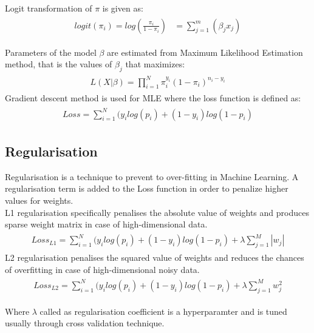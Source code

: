 \documentclass[paper=a4,fontsize=12pt]{article}
\begin{document}
Logit transformation of $\pi$ is given as: 
\begin{align*}
\begin{split}
logit(\pi_i) = log(\frac{\pi_i}{1-\pi_i})
&= \sum_{j=1}^{m} (\beta_j x_j)
\end{split}
\end{align*}

Parameters of the model $\beta$ are estimated from Maximum Likelihood Estimation method, that is the values of $\beta_j$ that maximizes:
\begin{align*}
\begin{split}
L(X|\beta) = \prod_{i=1}^{N} \pi_i^{y_i} (1-\pi_i)^{n_i - y_i}  
\end{split}
\end{align*}
Gradient descent method is used for MLE where the loss function is defined as:
\begin{align*}
\begin{split}
Loss = \sum_{i=1}^{N} (y_i log(p_i) + (1-y_i)log(1-p_i)
\end{split}
\end{align*}


\subsection{Regularisation}
Regularisation is a technique to prevent to over-fitting in Machine Learning. A regularisation term is added to the Loss function in order to penalize higher values for weights.\\
L1 regularisation specifically penalises the absolute value of weights and produces sparse weight matrix in case of high-dimensional data. 
\begin{align*}
\begin{split}
Loss_{L1} = \sum_{i=1}^{N} (y_i log(p_i) + (1-y_i)log(1-p_i) + \lambda \sum_{j=1}^{M} |w_j|
\end{split}
\end{align*}
L2 regularisation penalises the squared value of weights and reduces the chances of overfitting in case of high-dimensional noisy data.
\begin{align*}
\begin{split}
Loss_{L2} = \sum_{i=1}^{N} (y_i log(p_i) + (1-y_i)log(1-p_i) + \lambda \sum_{j=1}^{M} w_j^2
\end{split}
\end{align*}

Where $\lambda$ called as regularisation coefficient is a hyperparamter and is tuned usually through cross validation technique.
\end{document}
